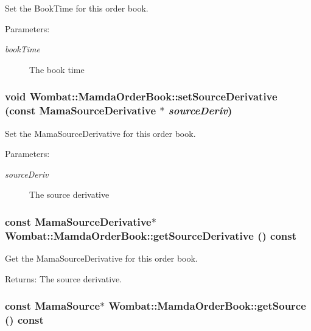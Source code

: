 Set the Book\-Time for this order book. 

\begin{Desc}
\item[Parameters:]
\begin{description}
\item[{\em book\-Time}]The book time \end{description}
\end{Desc}
\hypertarget{classWombat_1_1MamdaOrderBook_10daa10168a2ee4696628fc22679daa3}{
\subsubsection[setSourceDerivative]{\setlength{\rightskip}{0pt plus 5cm}void Wombat::Mamda\-Order\-Book::set\-Source\-Derivative (const Mama\-Source\-Derivative $\ast$ {\em source\-Deriv})}}
\label{classWombat_1_1MamdaOrderBook_10daa10168a2ee4696628fc22679daa3}


Set the Mama\-Source\-Derivative for this order book. 

\begin{Desc}
\item[Parameters:]
\begin{description}
\item[{\em source\-Deriv}]The source derivative \end{description}
\end{Desc}
\hypertarget{classWombat_1_1MamdaOrderBook_13998c53425af7024b447ccc0c7dc1e9}{
\subsubsection[getSourceDerivative]{\setlength{\rightskip}{0pt plus 5cm}const Mama\-Source\-Derivative$\ast$ Wombat::Mamda\-Order\-Book::get\-Source\-Derivative () const}}
\label{classWombat_1_1MamdaOrderBook_13998c53425af7024b447ccc0c7dc1e9}


Get the Mama\-Source\-Derivative for this order book. 

\begin{Desc}
\item[Returns:]The source derivative. \end{Desc}
\hypertarget{classWombat_1_1MamdaOrderBook_57c40a11c3f31d5fee6072f41f13b81a}{
\subsubsection[getSource]{\setlength{\rightskip}{0pt plus 5cm}const Mama\-Source$\ast$ Wombat::Mamda\-Order\-Book::get\-Source () const}}
\label{classWombat_1_1MamdaOrderBook_57c40a11c3f31d5fee6072f41f13b81a}


